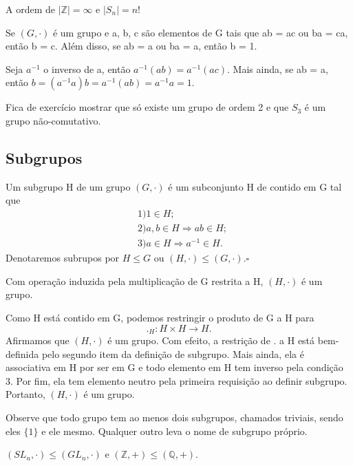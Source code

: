 \documentclass[algebra_notes.tex]{subfiles}
\begin{document}
\begin{example*}
	A ordem de $|\mathbb{Z}| = \infty$ e $|S_{n}| = n!$ \qedsymbol
\end{example*}
\begin{prop*}
	Se $(G, \cdot)$ é um grupo e a, b, c são elementos de G tais que ab = ac ou ba = ca, então b = c. Além disso, se ab = a ou
	ba = a, então b = 1.
\end{prop*}
\begin{proof*}
	Seja $a^{-1}$ o inverso de a, então $a^{-1}(ab) = a^{-1}(ac).$ Mais ainda, se ab = a, então $b = (a^{-1}a)b = a^{-1}(ab) = a^{-1}a = 1.$
\end{proof*}
Fica de exercício mostrar que só existe um grupo de ordem 2 e que $S_{3}$ é um grupo não-comutativo.
\subsection{Subgrupos}
\begin{def*}
	Um subgrupo H de um grupo $(G, \cdot)$ é um subconjunto H de contido em G tal que
	\begin{align*}
		 & 1) 1\in H;                        \\
		 & 2) a, b\in H\Rightarrow ab \in H; \\
		 & 3) a\in H\Rightarrow a^{-1}\in H.
	\end{align*}
	Denotaremos subrupos por $H \leq{G}$ ou $(H, \cdot) \leq{(G, \cdot)}. \square$
\end{def*}
\begin{prop*}
	Com operação induzida pela multiplicação de G restrita a H, $(H, \cdot)$ é um grupo.
\end{prop*}
\begin{proof*}
	Como H está contido em G, podemos restringir o produto de G a H para
	$$
		._H:H \times H\rightarrow H.
	$$
	Afirmamos que $(H, \cdot)$ é um grupo. Com efeito, a restrição de . a H está bem-definida pelo segundo item da definição
	de subgrupo. Mais ainda, ela é associativa em H por ser em G e todo elemento em H tem inverso pela condição 3. Por fim,
	ela tem elemento neutro pela primeira requisição ao definir subgrupo. Portanto, $(H, \cdot)$ é um grupo.
\end{proof*}
Observe que todo grupo tem ao menos dois subgrupos, chamados triviais, sendo eles $\{1\}$ e ele mesmo. Qualquer outro leva o nome de
subgrupo próprio.
\begin{example*}
	$(SL_{n}, \cdot) \leq{(GL_{n}, \cdot)}$ e $(\mathbb{Z}, +) \leq{(\mathbb{Q}, +)}.$ \qedsymbol
\end{example*}
\end{document}
